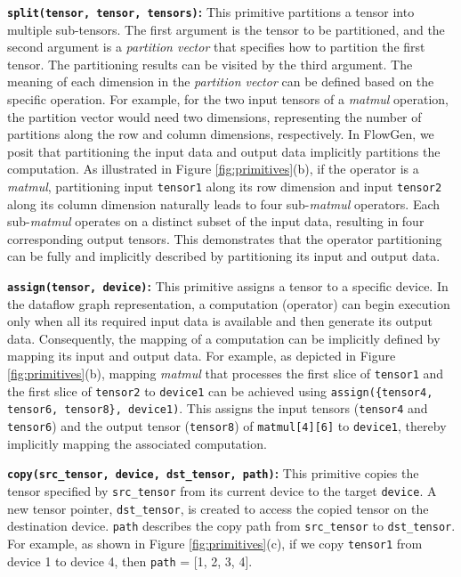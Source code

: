 \textbf{\texttt{split(tensor, tensor, tensors)}:} This primitive partitions a tensor into multiple sub-tensors. The first argument is the tensor to be partitioned, and the second argument is a \textit{partition vector} that specifies how to partition the first tensor. The partitioning results can be visited by the third argument. The meaning of each dimension in the \textit{partition vector} can be defined based on the specific operation. For example, for the two input tensors of a \textit{matmul} operation, the partition vector would need two dimensions, representing the number of partitions along the row and column dimensions, respectively. In FlowGen, we posit that partitioning the input data and output data implicitly partitions the computation. As illustrated in Figure \ref{fig:primitives}(b), if the operator is a \textit{matmul}, partitioning input \texttt{tensor1} along its row dimension and input \texttt{tensor2} along its column dimension naturally leads to four sub-\textit{matmul} operators. Each sub-\textit{matmul} operates on a distinct subset of the input data, resulting in four corresponding output tensors. This demonstrates that the operator partitioning can be fully and implicitly described by partitioning its input and output data.

\textbf{\texttt{assign(tensor, device)}:} This primitive assigns a tensor to a specific device. In the dataflow graph representation, a computation (operator) can begin execution only when all its required input data is available and then generate its output data.  Consequently, the mapping of a computation can be implicitly defined by mapping its input and output data. For example, as depicted in Figure \ref{fig:primitives}(b), mapping \textit{matmul} that processes the first slice of \texttt{tensor1} and the first slice of \texttt{tensor2} to \texttt{device1} can be achieved using \texttt{assign(\{tensor4, tensor6, tensor8\}, device1)}. This assigns the input tensors (\texttt{tensor4} and \texttt{tensor6}) and the output tensor (\texttt{tensor8}) of \texttt{matmul[4][6]} to \texttt{device1}, thereby implicitly mapping the associated computation.

\textbf{\texttt{copy(src\_tensor, device, dst\_tensor, path)}:} This primitive copies the tensor specified by \texttt{src\_tensor} from its current device to the target \texttt{device}. A new tensor pointer, \texttt{dst\_tensor}, is created to access the copied tensor on the destination device. \texttt{path} describes the copy path from \texttt{src\_tensor} to \texttt{dst\_tensor}. For example, as shown in Figure \ref{fig:primitives}(c), if we copy \texttt{tensor1} from device 1 to device 4, then \texttt{path} = [1, 2, 3, 4].

